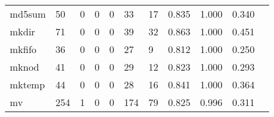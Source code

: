 \begin{longtable}{lp{1.2cm}p{1.2cm}p{1.2cm}p{1.2cm}p{1.2cm}p{1.2cm}p{1.2cm}p{1.2cm}p{1.2cm}p{1.2cm}}
md5sum    &                                    50 &                                                  0 &                                                  0 &                                                  0 &                                                 33 &                                                 17 &                                         0.835 &                                              1.000 &                                              0.340 \\
mkdir     &                                    71 &                                                  0 &                                                  0 &                                                  0 &                                                 39 &                                                 32 &                                         0.863 &                                              1.000 &                                              0.451 \\
mkfifo    &                                    36 &                                                  0 &                                                  0 &                                                  0 &                                                 27 &                                                  9 &                                         0.812 &                                              1.000 &                                              0.250 \\
mknod     &                                    41 &                                                  0 &                                                  0 &                                                  0 &                                                 29 &                                                 12 &                                         0.823 &                                              1.000 &                                              0.293 \\
mktemp    &                                    44 &                                                  0 &                                                  0 &                                                  0 &                                                 28 &                                                 16 &                                         0.841 &                                              1.000 &                                              0.364 \\
mv        &                                   254 &                                                  1 &                                                  0 &                                                  0 &                                                174 &                                                 79 &                                         0.825 &                                              0.996 &                                              0.311 \\

\end{longtable}
